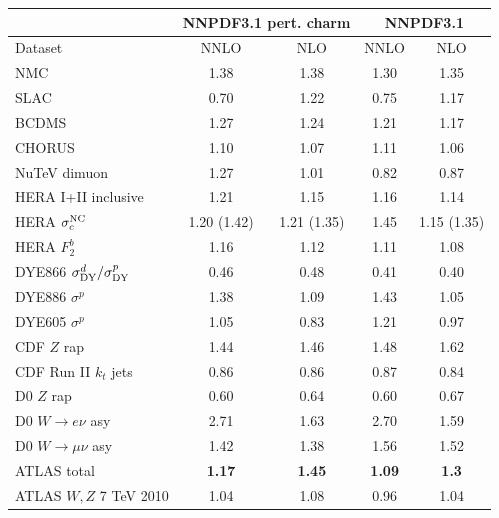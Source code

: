 \begin{table}[h]
\begin{center}
  \scriptsize
      \renewcommand{\arraystretch}{1.10}
\begin{tabular}{|l|c|c||c|c|}
  \hline
  &  \multicolumn{2}{c||}{NNPDF3.1 pert. charm} &
  \multicolumn{2}{c|}{NNPDF3.1}\\
  \hline
Dataset  &    NNLO  & NLO 
& NNLO    & NLO  \\
\hline
\hline
NMC      &   1.38     &   1.38   &    1.30     &   1.35 \\    
SLAC      &   0.70      &   1.22  &    0.75      &   1.17   \\    
BCDMS       &   1.27      &   1.24  &    1.21      &   1.17   \\    
CHORUS       &   1.10      &   1.07    &    1.11      &   1.06  \\    
NuTeV dimuon       &   1.27      &   1.01  &    0.82      &   0.87  \\
\hline
HERA I+II inclusive       &   1.21      &   1.15&    1.16      &   1.14   \\
HERA $\sigma_c^{\rm NC}$       &   1.20 (1.42)    &   1.21 (1.35)
 &    1.45      &   1.15 (1.35)\\
HERA $F_2^b$       &   1.16      &   1.12
&    1.11      &   1.08  \\
\hline
\hline
DYE866 $\sigma^d_{\rm DY}/\sigma^p_{\rm DY}$
   &   0.46     &   0.48   &    0.41     &   0.40 \\
DYE886 $\sigma^p$       &   1.38     &   1.09 &    1.43     &   1.05    \\
DYE605  $\sigma^p$      &   1.05     &   0.83 &    1.21     &   0.97  \\
\hline
CDF $Z$ rap       &   1.44      &   1.46   &    1.48     &   1.62 \\
CDF Run II $k_t$ jets       &   0.86      &   0.86
&    0.87      &   0.84 \\
\hline
D0 $Z$ rap       &   0.60      &   0.64 &    0.60      &   0.67   \\
D0 $W\to e\nu$  asy      &   2.71      &   1.63
&    2.70      &   1.59    \\
D0 $W\to \mu\nu$  asy       &   1.42      &   1.38
&    1.56      &   1.52 \\
\hline
\hline
ATLAS total      &   {\bf 1.17}     &  {\bf 1.45}  &
{\bf 1.09}      &   {\bf 1.3}  \\    
  ATLAS $W,Z$ 7 TeV 2010      &   1.04      &   1.08 &   0.96     &   1.04  \\

\end{tabular}
\end{center}
\end{table}
